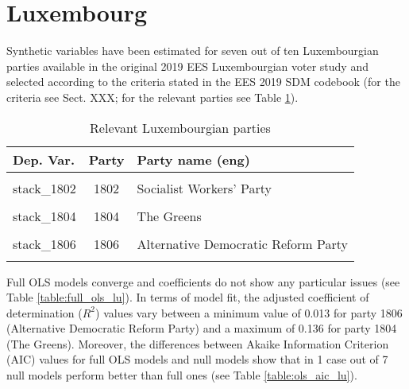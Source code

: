 \documentclass[
]{article}
\begin{document}
\clearpage

\newpage

\hypertarget{luxembourg}{%
\section{Luxembourg}\label{luxembourg}}

Synthetic variables have been estimated for seven out of ten Luxembourgian parties available in the original
2019 EES Luxembourgian voter study and selected according to the criteria stated in the EES 2019 SDM codebook (for the criteria see Sect. XXX; for the relevant parties see Table \ref{table:relprty_tab_lu}).

\begin{table}[!h]

\caption{\label{tab:unnamed-chunk-117}Relevant Luxembourgian parties \label{table:relprty_tab_lu}}
\centering
\begin{tabular}[t]{lcl}
\toprule
Dep. Var. & Party & Party name (eng)\\
\midrule
\cellcolor{gray!6}{stack\_1801} & \cellcolor{gray!6}{1801} & \cellcolor{gray!6}{Christian Social People's Party}\\
stack\_1802 & 1802 & Socialist Workers' Party\\
\cellcolor{gray!6}{stack\_1803} & \cellcolor{gray!6}{1803} & \cellcolor{gray!6}{Democratic Party}\\
stack\_1804 & 1804 & The Greens\\
\cellcolor{gray!6}{stack\_1805} & \cellcolor{gray!6}{1805} & \cellcolor{gray!6}{The Left}\\
\addlinespace
stack\_1806 & 1806 & Alternative Democratic Reform Party\\
\cellcolor{gray!6}{stack\_1807} & \cellcolor{gray!6}{1807} & \cellcolor{gray!6}{Pirate Party of Luxembourg}\\
\bottomrule
\end{tabular}
\end{table}

Full OLS models converge and coefficients do not show any particular issues (see Table
\ref{table:full_ols_lu}).
In terms of model fit, the adjusted coefficient of determination (\(R^2\)) values vary between
a minimum value of 0.013
for party 1806
(Alternative Democratic Reform Party)
and a maximum of 0.136
for party 1804
(The Greens).
Moreover, the differences between Akaike Information Criterion (AIC) values for full OLS models and null
models show that in 1 case out of 7 null models perform better than full ones (see Table
\ref{table:ols_aic_lu}).
\end{document}
